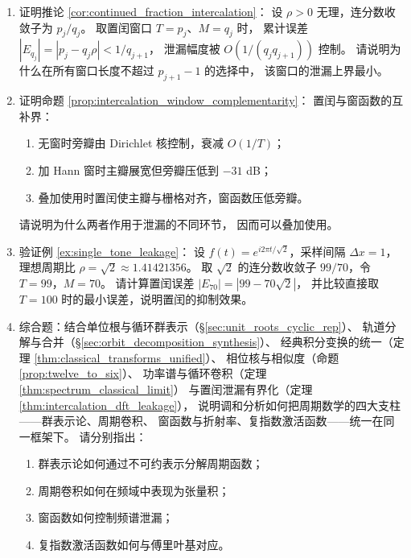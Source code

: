 \begin{enumerate}[leftmargin=3em, label=\textbf{题 \arabic*}]
    \item 证明推论 \ref{cor:continued_fraction_intercalation}：
    设 $\rho>0$ 无理，连分数收敛子为 $p_j/q_j$。
    取置闰窗口 $T=p_j$、$M=q_j$ 时，
    累计误差 $|E_{q_j}|=|p_j-q_j\rho|<1/q_{j+1}$，
    泄漏幅度被 $O(1/(q_jq_{j+1}))$ 控制。
    请说明为什么在所有窗口长度不超过 $p_{j+1}-1$ 的选择中，
    该窗口的泄漏上界最小。

    \item 证明命题 \ref{prop:intercalation_window_complementarity}：
    置闰与窗函数的互补界：
    \begin{enumerate}[label=(\roman*)]
        \item 无窗时旁瓣由 Dirichlet 核控制，衰减 $O(1/T)$；
        \item 加 Hann 窗时主瓣展宽但旁瓣压低到 $-31$ dB；
        \item 叠加使用时置闰使主瓣与栅格对齐，窗函数压低旁瓣。
    \end{enumerate}
    请说明为什么两者作用于泄漏的不同环节，
    因而可以叠加使用。

    \item 验证例 \ref{ex:single_tone_leakage}：
    设 $f(t)=e^{i2\pi t/\sqrt{2}}$，采样间隔 $\Delta x=1$，
    理想周期比 $\rho=\sqrt{2}\approx1.41421356$。
    取 $\sqrt{2}$ 的连分数收敛子 $99/70$，令 $T=99$，$M=70$。
    请计算置闰误差 $|E_{70}|=|99-70\sqrt{2}|$，
    并比较直接取 $T=100$ 时的最小误差，说明置闰的抑制效果。

    \item 综合题：结合单位根与循环群表示（\S\ref{sec:unit_roots_cyclic_rep}）、
    轨道分解与合并（\S\ref{sec:orbit_decomposition_synthesis}）、
    经典积分变换的统一（定理 \ref{thm:classical_transforms_unified}）、
    相位核与相似度（命题 \ref{prop:twelve_to_six}）、
    功率谱与循环卷积（定理 \ref{thm:spectrum_classical_limit}）
    与置闰泄漏有界化（定理 \ref{thm:intercalation_dft_leakage}），
    说明调和分析如何把周期数学的四大支柱——群表示论、周期卷积、
    窗函数与折射率、复指数激活函数——统一在同一框架下。
    请分别指出：
    \begin{enumerate}[label=(\roman*)]
        \item 群表示论如何通过不可约表示分解周期函数；
        \item 周期卷积如何在频域中表现为张量积；
        \item 窗函数如何控制频谱泄漏；
        \item 复指数激活函数如何与傅里叶基对应。
    \end{enumerate}
\end{enumerate}

